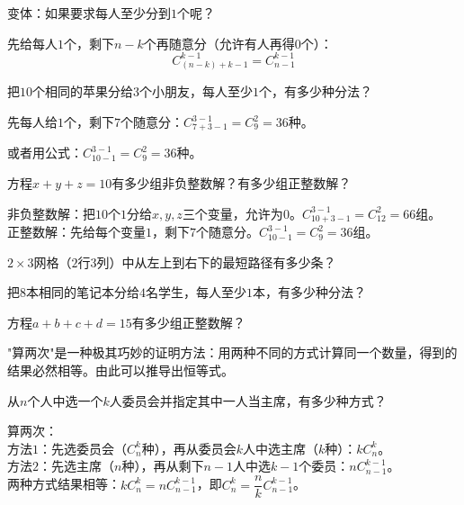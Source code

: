 变体：如果要求每人至少分到$1$个呢？

先给每人$1$个，剩下$n-k$个再随意分（允许有人再得$0$个）：
\[
C_{(n-k)+k-1}^{k-1} = C_{n-1}^{k-1}
\]

\begin{example}
把$10$个相同的苹果分给$3$个小朋友，每人至少$1$个，有多少种分法？
\end{example}
\begin{solution}
先每人给$1$个，剩下$7$个随意分：$C_{7+3-1}^{3-1} = C_9^2 = 36$种。

或者用公式：$C_{10-1}^{3-1} = C_9^2 = 36$种。
\end{solution}

\begin{example}
方程$x+y+z=10$有多少组非负整数解？有多少组正整数解？
\end{example}
\begin{solution}
非负整数解：把$10$个$1$分给$x,y,z$三个变量，允许为$0$。$C_{10+3-1}^{3-1}=C_{12}^2=66$组。\\
正整数解：先给每个变量$1$，剩下$7$个随意分。$C_{10-1}^{3-1}=C_9^2=36$组。
\end{solution}

\begin{exercise}
\item $2\times3$网格（$2$行$3$列）中从左上到右下的最短路径有多少条？
\item 把$8$本相同的笔记本分给$4$名学生，每人至少$1$本，有多少种分法？
\item 方程$a+b+c+d=15$有多少组正整数解？
\end{exercise}


"算两次"是一种极其巧妙的证明方法：用两种不同的方式计算同一个数量，得到的结果必然相等。由此可以推导出恒等式。

\begin{example}
从$n$个人中选一个$k$人委员会并指定其中一人当主席，有多少种方式？
\end{example}
\begin{solution}
算两次：\\
方法$1$：先选委员会（$C_n^k$种），再从委员会$k$人中选主席（$k$种）：$kC_n^k$。\\
方法$2$：先选主席（$n$种），再从剩下$n-1$人中选$k-1$个委员：$nC_{n-1}^{k-1}$。\\
两种方式结果相等：$kC_n^k = nC_{n-1}^{k-1}$，即$C_n^k = \dfrac{n}{k}C_{n-1}^{k-1}$。
\end{solution}

